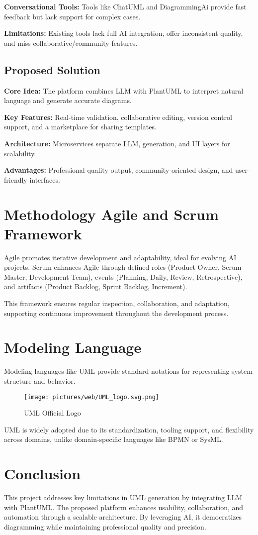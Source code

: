 \textbf{Conversational Tools:} Tools like ChatUML\cite{1} and DiagrammingAi\cite{2} provide fast feedback but lack support for complex cases.

\textbf{Limitations:} Existing tools lack full AI integration, offer inconsistent quality, and miss collaborative/community features.

\subsection{Proposed Solution}

\textbf{Core Idea:} The platform combines LLM with PlantUML to interpret natural language and generate accurate diagrams.

\textbf{Key Features:} Real-time validation, collaborative editing, version control support, and a marketplace for sharing templates.

\textbf{Architecture:} Microservices separate LLM, generation, and UI layers for scalability.

\textbf{Advantages:} Professional-quality output, community-oriented design, and user-friendly interfaces.


\section{Methodology Agile and Scrum Framework}

Agile promotes iterative development and adaptability, ideal for evolving AI projects. Scrum enhances Agile through defined roles (Product Owner, Scrum Master, Development Team), events (Planning, Daily, Review, Retrospective), and artifacts (Product Backlog, Sprint Backlog, Increment).

This framework ensures regular inspection, collaboration, and adaptation, supporting continuous improvement throughout the development process.

\section{Modeling Language}

Modeling languages like UML provide standard notations for representing system structure and behavior.

\begin{figure}[htbp]
\centering
\texttt{[image: pictures/web/UML\_logo.svg.png]}
\caption{UML Official Logo}
\label{fig:uml_logo}
\end{figure}

UML is widely adopted due to its standardization, tooling support, and flexibility across domains, unlike domain-specific languages like BPMN or SysML.

\section{Conclusion}
This project addresses key limitations in UML generation by integrating LLM with PlantUML.
The proposed platform enhances usability, collaboration, and automation through a scalable architecture.
By leveraging AI, it democratizes diagramming while maintaining professional quality and precision.
